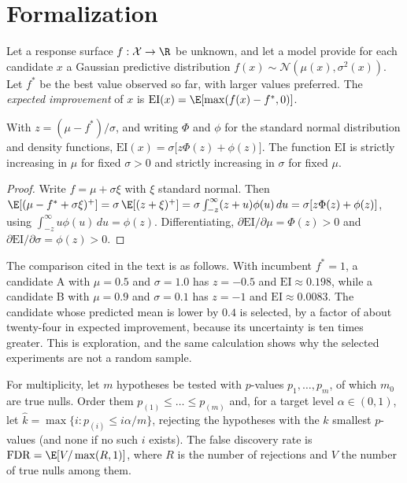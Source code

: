 \section*{Formalization}

Let a response surface $f:\mathcal X\to\R$ be unknown, and let a model provide for each candidate $x$ a Gaussian predictive distribution $f(x)\sim\mathcal N(\mu(x),\sigma^2(x))$. Let $f^\ast$ be the best value observed so far, with larger values preferred. The \emph{expected improvement} of $x$ is $\mathrm{EI}(x)=\E[\max(f(x)-f^\ast,0)]$.

\begin{proposition}
With $z=(\mu-f^\ast)/\sigma$, and writing $\Phi$ and $\phi$ for the standard normal distribution and density functions, $\mathrm{EI}(x)=\sigma\bigl[z\Phi(z)+\phi(z)\bigr]$. The function $\mathrm{EI}$ is strictly increasing in $\mu$ for fixed $\sigma>0$ and strictly increasing in $\sigma$ for fixed $\mu$.
\end{proposition}

\begin{proof}
Write $f=\mu+\sigma\xi$ with $\xi$ standard normal. Then $\E[(\mu-f^\ast+\sigma\xi)^+]=\sigma\,\E[(z+\xi)^+]=\sigma\int_{-z}^{\infty}(z+u)\phi(u)\,du=\sigma[z\Phi(z)+\phi(z)]$, using $\int_{-z}^\infty u\phi(u)\,du=\phi(z)$. Differentiating, $\partial\mathrm{EI}/\partial\mu=\Phi(z)>0$ and $\partial\mathrm{EI}/\partial\sigma=\phi(z)>0$.
\end{proof}

The comparison cited in the text is as follows. With incumbent $f^\ast=1$, a candidate A with $\mu=0.5$ and $\sigma=1.0$ has $z=-0.5$ and $\mathrm{EI}\approx0.198$, while a candidate B with $\mu=0.9$ and $\sigma=0.1$ has $z=-1$ and $\mathrm{EI}\approx0.0083$. The candidate whose predicted mean is lower by $0.4$ is selected, by a factor of about twenty-four in expected improvement, because its uncertainty is ten times greater. This is exploration, and the same calculation shows why the selected experiments are not a random sample.

For multiplicity, let $m$ hypotheses be tested with $p$-values $p_1,\dots,p_m$, of which $m_0$ are true nulls. Order them $p_{(1)}\le\dots\le p_{(m)}$ and, for a target level $\alpha\in(0,1)$, let $\hat k=\max\{i:p_{(i)}\le i\alpha/m\}$, rejecting the hypotheses with the $\hat k$ smallest $p$-values (and none if no such $i$ exists). The false discovery rate is $\mathrm{FDR}=\E[V/\max(R,1)]$, where $R$ is the number of rejections and $V$ the number of true nulls among them.

